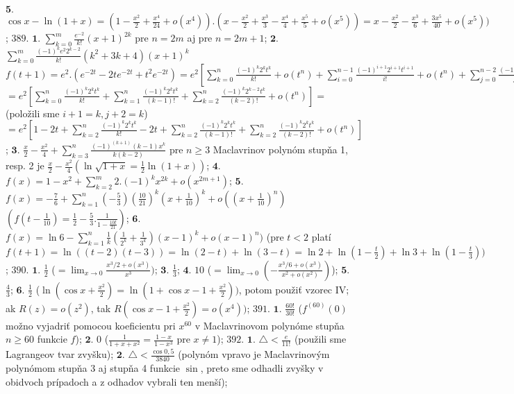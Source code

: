 $\boldsymbol{5.}$ $\cos x-\ln (1+x)=(1-\frac{x^{2}}{2}+\frac{x^{4}}{24}+o(x^{4})). (x-\frac{x^{2}}{2}+\frac{x^{3}}{3}-\frac{x^{4}}{4}+\frac{x^{5}}{5}+ o(x^{5}))=x-\frac{x^{2}}{2}-\frac{x^{3}}{6}+\frac{3x^{5}}{40}+ o(x^{5}))$;
$\boxed{389.}$ $\boldsymbol{1.}$  $\sum_{k=0}^m\frac{e^{-2}}{k!}(x+1)^{2k} $ pre $n=2m$ aj pre $n=2m+1$;
$\boldsymbol{2.}$  $\sum_{k=0}^m\frac{(-1)^{k}e^{2}2^{k-2}}{k!}(k^{2}+3k+4)(x+1)^{k} $ $f(t+1)=e^{2}.(e^{-2t}-2te^{-2t}+t^{2}e^{-2t})=e^{2}[\sum_{k=0}^n\frac{(-1)^{k}2^{k}t^{k}}{k!} +o(t^{n})+\sum_{i=0}^{n-1}\frac{(-1)^{i+1}2^{i+1}t^{i+1}}{i!} +o(t^{n})+\sum_{j=0}^{n-2}\frac{(-1)^{j}2^{j}t^{j}}{j!} +o(t^{n})]$ $=e^{2}[\sum_{k=0}^n\frac{(-1)^{k}2^{k}t^{k}}{k!}+\sum_{k=1}^n\frac{(-1)^{k}2^{k}t^{k}}{(k-1)!}+\sum_{k=2}^n\frac{(-1)^{k}2^{k-2}t^{k}}{(k-2)!}+o(t^{n})]=$ (položili sme $i+1=k,j+2=k$)$=e^{2}[1-2t+\sum_{k=2}^n\frac{(-1)^{k}2^{k}t^{k}}{k!}-2t+\sum_{k=2}^n\frac{(-1)^{k}2^{k}t^{k}}{(k-1)!}+\sum_{k=2}^n\frac{(-1)^{k}2^{k}t^{k}}{(k-2)!}+o(t^{n})]$;
$\boldsymbol{3.}$   $\frac{x}{2}-\frac{x^{2}}{4}+\sum_{k=3}^n\frac{(-1)^{(k+1)}(k-1)x^{k}}{k(k-2)}$ pre  $n\geq 3$ Maclavrinov polynóm stupňa 1, resp. 2 je $\frac{x}{2}-\frac{x^{2}}{4}(\ln \sqrt{1+x}=\frac{1}{2}\ln (1+x))$;
$\boldsymbol{4.}$ $f(x)=1-x^{2}+\sum_{k=2}^m 2.(-1)^{k}x^{2k}+o(x^{2m+1})$;
$\boldsymbol{5.}$ $f(x)=-\frac{7}{6}+\sum_{k=1}^n (-\frac{5}{3})(\frac{10}{21})^{k}(x+\frac{1}{10})^{k}+o((x+\frac{1}{10})^{n})$  $(f(t-\frac{1}{10})=\frac{1}{2}-\frac{5}{3}.\frac{1}{1-\frac{10t}{21}})$;
$\boldsymbol{6.}$ $f(x)= \ln 6 - \sum_{k=1}^n \frac{1}{k}(\frac{1}{2^{k}}+\frac{1}{3^{k}})(x-1)^{k}+o(x-1)^{n})$ (pre $t<2$ platí $f(t+1)=\ln ((t-2)(t-3))=\ln (2-t)+\ln (3-t)=\ln 2 +\ln (1-\frac{t}{2}) +\ln 3+\ln (1-\frac{t}{3}))$;
$\boxed{390.}$ $\boldsymbol{1.}$ $\frac{1}{2} $  ($= \lim_{x \to 0}\frac{x^{3}/2+o(x^{3})}{x^{3}})$;
$\boldsymbol{3.}$ $\frac{1}{3} $;
$\boldsymbol{4.}$ $10 $ ($= \lim_{x \to 0}(-\frac{x^{3}/6+o(x^{3})}{x^{2}+o(x^{2})})$);
$\boldsymbol{5.}$ $\frac{4}{3} $;
$\boldsymbol{6.}$ $\frac{1}{2} $ ($\ln (\cos x +\frac{x^{2}}{2})= \ln (1+\cos x -1 +\frac{x^{2}}{2}))$, potom použiť vzorec IV; ak $R(z)=o(z^{2})$, tak $R( \cos x -1+\frac{x^{2}}{2})= o(x^{4}))$;
$\boxed{391.}$ $\boldsymbol{1.}$ $\frac{60!}{30!} $  ($f^{(60)}(0)$ možno vyjadriť pomocou koeficientu pri $x^{60}$ v Maclavrinovom polynóme stupňa $n\geq 60$ funkcie $f$);
$\boldsymbol{2.}$ $0$  ($\frac{1}{1+x+x^{2}}=\frac{1-x}{1-x^{3}}$ pre $x \ne 1$);
$\boxed{392.}$ $\boldsymbol{1.}$ $\bigtriangleup < \frac{e}{11!}$ (použili sme Lagrangeov tvar zvyšku);
$\boldsymbol{2.}$ $\bigtriangleup < \frac{\cos 0,5}{3840}$ (polynóm vpravo je Maclavrinovým polynómom stupňa 3 aj stupňa 4 funkcie $\sin$, preto sme odhadli zvyšky v obidvoch prípadoch a z odhadov vybrali ten menší);
